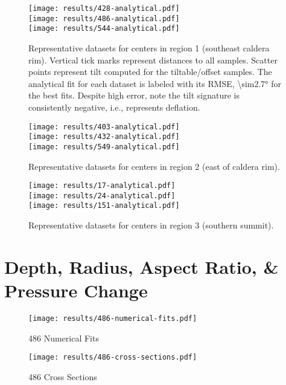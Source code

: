 \begin{figure}
    \vspace{-15pt}
    \texttt{[image: results/428-analytical.pdf]}\\
    \texttt{[image: results/486-analytical.pdf]}\\
    \texttt{[image: results/544-analytical.pdf]}%
    \caption[Southeast Caldera Rim: analytical fit]{Representative datasets for centers in region 1 (southeast caldera rim). Vertical tick marks represent distances to all samples. Scatter points represent tilt computed for the tiltable/offset samples. The analytical fit for each dataset is labeled with its \acs{RMSE}, \ang{\sim2.7} for the best fits. Despite high error, note the tilt signature is consistently negative, i.e., represents deflation.}
    \label{fig:region1-analytical}
\end{figure}

\begin{figure}
    \vspace{-15pt}
    \texttt{[image: results/403-analytical.pdf]}\\
    \texttt{[image: results/432-analytical.pdf]}\\
    \texttt{[image: results/549-analytical.pdf]}%
    \caption[East of Caldera Rim: analytical fit]{Representative datasets for centers in region 2 (east of caldera rim).}
    \label{fig:region2-analytical}
\end{figure}

\begin{figure}
    \texttt{[image: results/17-analytical.pdf]}\\
    \texttt{[image: results/24-analytical.pdf]}\\
    \texttt{[image: results/151-analytical.pdf]}%
    \caption[East of Caldera Rim: analytical fit]{Representative datasets for centers in region 3 (southern summit).}
    \label{fig:region34-analytical}
\end{figure}

\section{Depth, Radius, Aspect Ratio, \& Pressure Change}

\begin{figure}
    \texttt{[image: results/486-numerical-fits.pdf]}%
    \caption[486 Numerical Fits]{486 Numerical Fits}
    \label{fig:486-numerical-fits}
\end{figure}

\begin{figure}
    \texttt{[image: results/486-cross-sections.pdf]}%
    \caption[486 Cross Sections]{486 Cross Sections}
    \label{fig:486-cross-sections}
\end{figure}